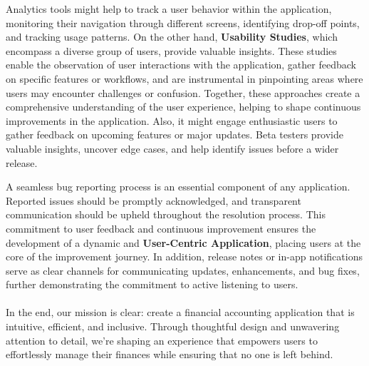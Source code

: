 Analytics tools might help to track a user behavior within the application, monitoring their navigation through 
different screens, identifying drop-off points, and tracking usage patterns. On the other hand, \textbf{Usability 
Studies}, which encompass a diverse group of users, provide valuable insights. These studies enable the observation of 
user interactions with the application, gather feedback on specific features or workflows, and are instrumental in 
pinpointing areas where users may encounter challenges or confusion. Together, these approaches create a comprehensive 
understanding of the user experience, helping to shape continuous improvements in the application. Also, it might  
engage enthusiastic users to gather feedback on upcoming features or major updates. Beta testers provide valuable 
insights, uncover edge cases, and help identify issues before a wider release.

A seamless bug reporting process is an essential component of any application. Reported issues should be promptly 
acknowledged, and transparent communication should be upheld throughout the resolution process. This commitment to 
user feedback and continuous improvement ensures the development of a dynamic and \textbf{User-Centric Application}, 
placing users at the core of the improvement journey. In addition, release notes or in-app notifications serve as clear 
channels for communicating updates, enhancements, and bug fixes, further demonstrating the commitment to active
listening to users.\\
\\

\noindent In the end, our mission is clear: create a financial accounting application that is intuitive, efficient, 
and inclusive. Through thoughtful design and unwavering attention to detail, we're shaping an experience that empowers 
users to effortlessly manage their finances while ensuring that no one is left behind.
